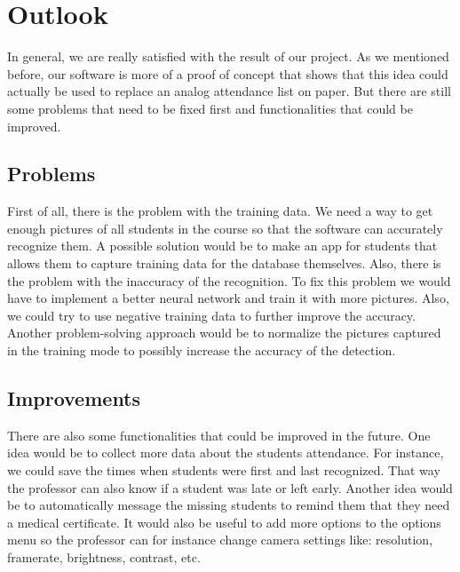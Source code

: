 \documentclass[12pt, a4paper]{article}
\begin{document}
\newpage




\section{Outlook}
In general, we are really satisfied with the result of our project. As we mentioned before, our software is more of a proof of concept that shows that this idea could actually be used to replace an analog attendance list on paper. But there are still some problems that need to be fixed first and functionalities that could be improved. 

\subsection{Problems}
First of all, there is the problem with the training data. We need a way to get enough pictures of all students in the course so that the software can accurately recognize them. A possible solution would be to make an app for students that allows them to capture training data for the database themselves. Also, there is the problem with the inaccuracy of the recognition. To fix this problem we would have to implement a better neural network and train it with more pictures. Also, we could  try to use negative training data to further improve the accuracy. Another problem-solving approach would be to normalize the pictures captured in the training mode to possibly increase the accuracy of the detection. 

\subsection{Improvements}
There are also some functionalities that could be improved in the future. One idea would be to collect more data about the students attendance. For instance, we could save the times when students were first and last recognized. That way the professor can also know if a student was late or left early. Another idea would be to automatically message the missing students to remind them that they need a medical certificate. It would also be useful to add more options to the options menu so the professor can for instance change camera settings like: resolution, framerate, brightness, contrast, etc. 
\newpage

\end{document}
